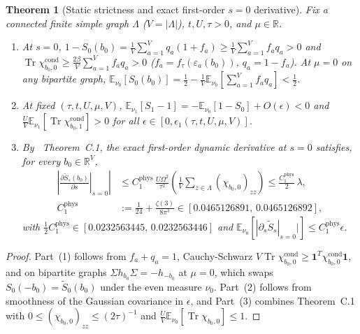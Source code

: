 \documentclass[11pt]{article}
\newtheorem{theorem}{Theorem}[section]
\theoremstyle{definition}
\theoremstyle{remark}
\DeclareMathOperator{\Tr}{Tr}
\newcommand{\E}{\mathbb{E}}
\newcommand{\R}{\mathbb{R}}
\begin{document}
\begin{theorem}[Static strictness and exact first-order $s=0$ derivative]
\label{thm:ae-s0}
Fix a connected finite simple graph $\Lambda$ ($V = |\Lambda|$), $t, U, \tau > 0$,
and $\mu \in \R$.
\begin{enumerate}[leftmargin=1.5em]
\item At $s = 0$, $1 - S_0(b_0) = \frac{1}{V}\sum_{a=1}^V q_a(1+f_a) \ge \frac{1}{V}\sum_{a=1}^V f_a q_a > 0$
and $\Tr\chi_{b_0,0}^{\mathrm{cond}} \ge \frac{2\beta}{V}\sum_{a=1}^V f_a q_a > 0$
($f_a = f_\tau(\varepsilon_a(b_0))$, $q_a = 1 - f_a$). At $\mu = 0$ on any
bipartite graph, $\E_{\nu_0}[S_0(b_0)] = \frac{1}{2} - \frac{1}{V}\E_{\nu_0}[\sum_{a=1}^V f_a q_a] < \frac{1}{2}$.
\item At fixed $(\tau, t, U, \mu, V)$, $\E_{\nu_1}[S_1 - 1] = -\E_{\nu_0}[1 - S_0] + O(\epsilon) < 0$
and $\frac{U}{V}\E_{\nu_1}[\Tr\chi_{b_0,1}^{\mathrm{cond}}] > 0$ for all $\epsilon \in [0, \epsilon_1(\tau,t,U,\mu,V)]$.
\item By~\cite{fisher} Theorem~C.1, the exact first-order dynamic derivative
at $s = 0$ satisfies, for every $b_0 \in \R^V$,
\begin{equation}
\label{eq:ae-c1phys}
\begin{aligned}
\left|\left.\frac{\partial \tilde{S}_s(b_0)}{\partial s}\right|_{s=0}\right|
&\le C_1^{\mathrm{phys}}\,\frac{U\Omega^2}{\tau^2}\left(\frac{1}{V}\sum_{z\in\Lambda} (\chi_{b_0,0})_{zz}\right)
\le \frac{C_1^{\mathrm{phys}}}{2}\,\lambda, \\
C_1^{\mathrm{phys}} &:= \frac{1}{24} + \frac{\zeta(3)}{8\pi^3} \in [0.0465126891,\, 0.0465126892],
\end{aligned}
\end{equation}
with $\frac{1}{2}C_1^{\mathrm{phys}} \in [0.0232563445,\, 0.0232563446]$ and
$\E_{\nu_0}[|\partial_s \tilde{S}_s|_{s=0}|] \le C_1^{\mathrm{phys}}\epsilon$.
\end{enumerate}
\end{theorem}

\begin{proof}
Part~(1) follows from $f_a + q_a = 1$, Cauchy-Schwarz $V\Tr\chi_{b_0,0}^{\mathrm{cond}} \ge \mathbf{1}^T \chi_{b_0,0}^{\mathrm{cond}}\mathbf{1}$,
and on bipartite graphs $\Sigma h_{b_0}\Sigma = -h_{-b_0}$ at $\mu=0$, which swaps
$S_0(-b_0) = \tilde{S}_0(b_0)$ under the even measure $\nu_0$. Part~(2) follows
from smoothness of the Gaussian covariance in $\epsilon$, and Part~(3) combines
\cite{fisher} Theorem~C.1 with $0 \le (\chi_{b_0,0})_{zz} \le (2\tau)^{-1}$ and
$\frac{U}{V}\E_{\nu_0}[\Tr\chi_{b_0,0}] \le 1$.
\end{proof}
\end{document}
